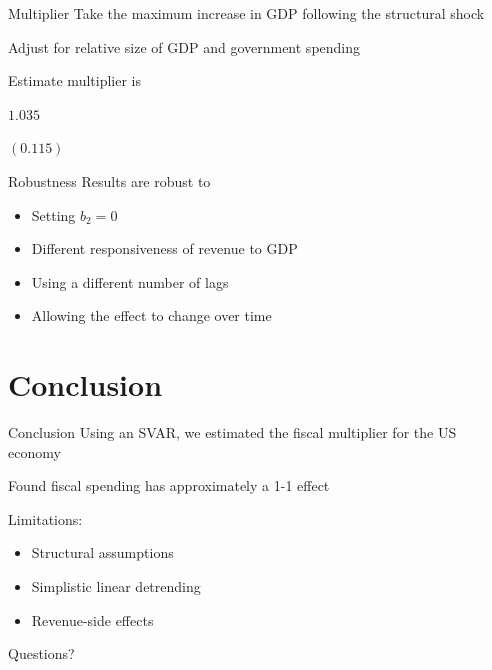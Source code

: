 \documentclass{beamer}
\begin{document}
\begin{frame}{Multiplier}
    Take the maximum increase in GDP following the structural shock

    Adjust for relative size of GDP and government spending

    Estimate multiplier is
    \begin{center}
        {\Large $1.035$}

        {\large $(0.115)$}
    \end{center}
\end{frame}

\begin{frame}{Robustness} \label{frame:robust}
    Results are robust to
    \begin{itemize}
        \item Setting $b_2 = 0$ \quad \hyperlink{frame:b20}{}
        \item Different responsiveness of revenue to GDP \quad \hyperlink{frame:c1}{}
        \item Using a different number of lags \quad \hyperlink{frame:order}{}
        \item Allowing the effect to change over time \quad \hyperlink{frame:time}{}
    \end{itemize}
\end{frame}


\section{Conclusion}

\begin{frame}{Conclusion}
    Using an SVAR, we estimated the fiscal multiplier for the US economy

    Found fiscal spending has approximately a 1-1 effect

    Limitations:
    \begin{itemize}
        \item Structural assumptions
        \item Simplistic linear detrending
        \item Revenue-side effects 
    \end{itemize}
\end{frame}


\begin{frame}[standout]
    Questions?
\end{frame}
\end{document}
